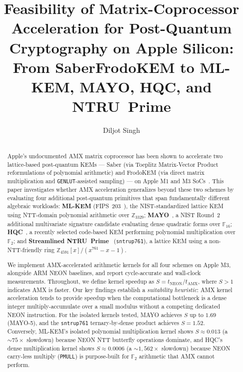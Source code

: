 \documentclass[utf8]{FrontiersinHarvard}
\title{Feasibility of Matrix-Coprocessor Acceleration for Post-Quantum Cryptography on Apple Silicon: From Saber\breakslash FrodoKEM to ML-KEM, MAYO, HQC, and NTRU~Prime}
\author[Singh]{Diljot Singh}
\begin{document}
\maketitle

\begin{abstract}
\section{}
Apple's undocumented AMX matrix coprocessor has been shown to accelerate two lattice-based post-quantum KEMs --- Saber (via Toeplitz Matrix-Vector Product reformulations of polynomial arithmetic) and FrodoKEM (via direct matrix multiplication and \texttt{GENLUT}-assisted sampling) --- on Apple M1 and M3 SoCs~\cite{gazzoni2024pqcamx}. This paper investigates whether AMX acceleration generalizes beyond these two schemes by evaluating four additional post-quantum primitives that span fundamentally different algebraic workloads: \textbf{ML-KEM} (FIPS~203~\cite{fips203}), the NIST-standardized lattice KEM using NTT-domain polynomial arithmetic over $\mathbb{Z}_{3329}$; \textbf{MAYO}~\cite{mayo2025spec}, a NIST Round~2 additional multivariate signature candidate evaluating dense quadratic forms over $\mathbb{F}_{16}$; \textbf{HQC}~\cite{hqc2025spec}, a recently selected code-based KEM performing polynomial multiplication over $\mathbb{F}_2$; and \textbf{Streamlined NTRU~Prime}~\cite{ntruprime2017spec} (\texttt{sntrup761}), a lattice KEM using a non-NTT-friendly ring $\mathbb{Z}_{4591}[x]/(x^{761}-x-1)$.

We implement AMX-accelerated arithmetic kernels for all four schemes on Apple M3, alongside ARM NEON baselines, and report cycle-accurate and wall-clock measurements. Throughout, we define kernel speedup as $S = t_{\text{NEON}} / t_{\text{AMX}}$, where $S > 1$ indicates AMX is faster. Our key findings establish a \emph{suitability heuristic}: AMX kernel acceleration tends to provide speedup when the computational bottleneck is a dense integer multiply-accumulate over a small modulus without a competing dedicated NEON instruction. For the isolated kernels tested, MAYO achieves $S$ up to $1.69$ (MAYO-5), and the \texttt{sntrup761} ternary-by-dense product achieves $S = 1.52$. Conversely, ML-KEM's isolated polynomial multiplication kernel shows $S \approx 0.013$ (a ${\sim}75\times$ slowdown) because NEON NTT butterfly operations dominate, and HQC's dense multiplication kernel shows $S \approx 0.0006$ (a ${\sim}1{,}562\times$ slowdown) because NEON carry-less multiply (\texttt{PMULL}) is purpose-built for $\mathbb{F}_2$ arithmetic that AMX cannot perform.

\end{abstract}
\end{document}
